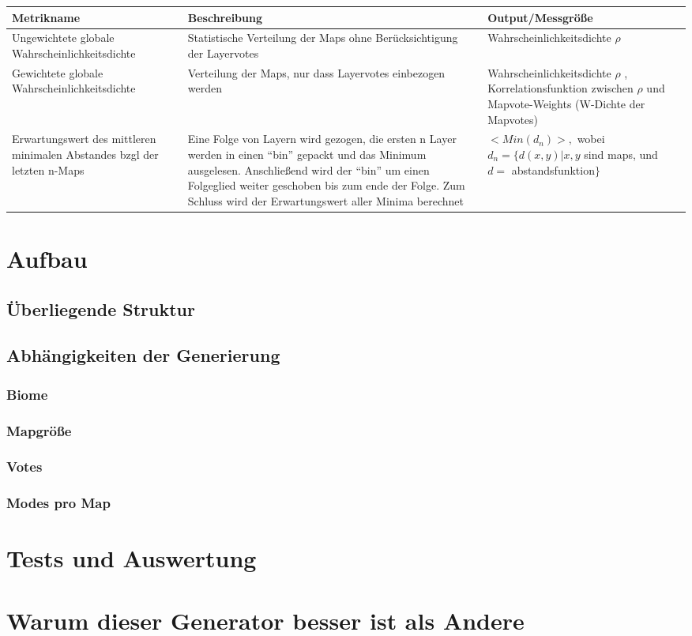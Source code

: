 \documentclass[a4paper, 11pt]{scrreprt}
\begin{document}
    \begin{center}
        \begin{tabular}{||m{4cm} m{4cm} m{5cm}||}
            \hline
            Metrikname & Beschreibung & Output/Messgröße\\
            \hline
            \hline
            Ungewichtete globale Wahrscheinlichkeitsdichte & 
            Statistische Verteilung der Maps ohne Berücksichtigung der Layervotes &
            Wahrscheinlichkeitsdichte $\rho$ \\
            \hline
            Gewichtete globale Wahrscheinlichkeitsdichte &
            Verteilung der Maps, nur dass Layervotes einbezogen werden &
            Wahrscheinlichkeitsdichte $\rho$ , Korrelationsfunktion zwischen $\rho$ und Mapvote-Weights (W-Dichte der Mapvotes) \\
            \hline
            Erwartungswert des mittleren minimalen Abstandes bzgl der letzten n-Maps &
            Eine Folge von Layern wird gezogen, die ersten n Layer werden in einen “bin” gepackt und das Minimum ausgelesen.
            Anschließend wird der “bin” um einen Folgeglied weiter geschoben bis zum ende der Folge. 
            Zum Schluss wird der Erwartungswert aller Minima berechnet &
            $< Min(d_n) >,$ wobei 
            $d_n=\{d(x,y) | x,y $ 
            sind maps, und 
            $ d = $ abstandsfunktion$\}$ \\
            \hline
        \end{tabular}
    \end{center}
    


    \chapter{Aufbau}
    \section{Überliegende Struktur}
    \section{Abhängigkeiten der Generierung}
    \subsection{Biome}
    \subsection{Mapgröße}
    \subsection{Votes}
    \subsection{Modes pro Map}

    \chapter{Tests und Auswertung}

    \chapter{Warum dieser Generator besser ist als Andere}

    \newpage

    \printbibliography[title=Literaturverzeichnis]
\end{document}
